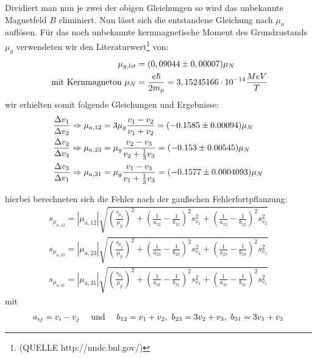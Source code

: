 \documentclass[12pt]{article}
\begin{document}
Dividiert man nun je zwei der obigen Gleichungen so wird das unbekannte Magnetfeld $B$ eliminiert. Nun lässt sich die entstandene Gleichung nach $\mu_a$
auflösen. Für das noch unbekannte kernmagnetische Moment des Grundzustands $\mu_g$ verwendeten wir den Literaturwert\footnote{(QUELLE http://nndc.bnl.gov/)} von:
\begin {align*}
 \mu_{g,lit} &= (0,09044 \pm 0,00007) \mu_N \\
 \textnormal{ mit Kernmagneton } \mu_N &= \frac{e \hbar}{2 m_p} = 3,15245166 \cdot 10^{-14} \frac{MeV}{T}
\end {align*}
wir erhielten somit folgende Gleichungen und Ergebnisse:
\begin{align}
 \notag \frac{\Delta v_1}{\Delta v_2} \Rightarrow \mu_{a,12} &= 3\mu_g \frac{v_1 - v_2}{v_1 + v_2} = (-0.1585 \pm 0.00094) \mu_N \\
 \notag \frac{\Delta v_2}{\Delta v_3} \Rightarrow \mu_{a,23} &= \mu_g \frac{v_2 - v_3}{v_2 + \frac{1}{3}v_3} = (-0.153 \pm 0.00545) \mu_N \\
 \notag \frac{\Delta v_3}{\Delta v_1} \Rightarrow \mu_{a,31} &= \mu_g \frac{v_1 - v_3}{v_1 + \frac{1}{3}v_3} = (-0.1577 \pm 0.0004093) \mu_N 
\end{align}

hierbei berechneten sich die Fehler nach der gaußschen Fehlerfortpflanzung:
\begin{align*}
 s_{\mu_{a,12}} = \left| \mu _{a,12} \right| \sqrt{\left( \frac{s_{\mu_g}}{\mu_g} \right) ^2 + \left( \frac{1}{a_{12}} - \frac{1}{b_{12}} \right) ^2 s_{v_1}^2 +
    \left( \frac{1}{a_{12}} - \frac{1}{b_{12}} \right) ^2 s_{v_2}^2} \\
 s_{\mu_{a,23}} = \left| \mu _{a,23} \right| \sqrt{\left( \frac{s_{\mu_g}}{\mu_g} \right) ^2 + \left( \frac{1}{a_{23}} - \frac{1}{b_{23}} \right) ^2 s_{v_2}^2 +
    \left( \frac{1}{a_{23}} - \frac{1}{b_{23}} \right) ^2 s_{v_3}^2} \\
 s_{\mu_{a,31}} = \left| \mu _{a,31} \right| \sqrt{\left( \frac{s_{\mu_g}}{\mu_g} \right) ^2 + \left( \frac{1}{a_{31}} - \frac{1}{b_{31}} \right) ^2 s_{v_3}^2 +
    \left( \frac{1}{a_{31}} - \frac{1}{b_{31}} \right) ^2 s_{v_1}^2}
\end{align*}
mit
\begin{align*}
 a_{ij} = v_i - v_j\hspace{10pt}\textnormal{ und }\hspace{10pt}b_{12} = v_1 + v_2, ~ b_{23} = 3v_2+v_3,~b_{31}=3v_1+v_3
\end{align*}
\end{document}
